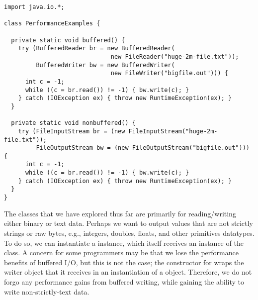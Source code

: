 \begin{lstlisting}[language=MyJava]
import java.io.*;

class PerformanceExamples {
  
  private static void buffered() {
    try (BufferedReader br = new BufferedReader(
                              new FileReader("huge-2m-file.txt"));
         BufferedWriter bw = new BufferedWriter(
                              new FileWriter("bigfile.out"))) {
      int c = -1;
      while ((c = br.read()) != -1) { bw.write(c); }
    } catch (IOException ex) { throw new RuntimeException(ex); }
  }
  
  private static void nonbuffered() {
    try (FileInputStream br = (new FileInputStream("huge-2m-file.txt"));
         FileOutputStream bw = (new FileOutputStream("bigfile.out"))) {
      int c = -1;
      while ((c = br.read()) != -1) { bw.write(c); }
    } catch (IOException ex) { throw new RuntimeException(ex); }
  }
}
\end{lstlisting}  

The classes that we have explored thus far are primarily for reading/writing either binary or text data. 
Perhaps we want to output values that are not strictly strings or raw bytes, e.g., integers, doubles, floats, and other primitives datatypes. 
To do so, we can instantiate a  instance, which itself receives an instance of the  class. 
A concern for some programmers may be that we lose the performance benefits of buffered I/O, but this is not the case; the constructor for  wraps the writer object that it receives in an instantiation of a  object. 
Therefore, we do not forgo any performance gains from buffered writing, while gaining the ability to write non-strictly-text data.

